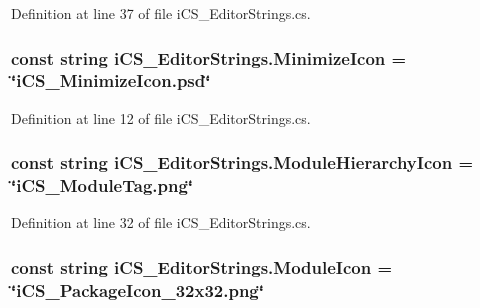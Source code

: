 Definition at line 37 of file i\+C\+S\+\_\+\+Editor\+Strings.\+cs.

\hypertarget{classi_c_s___editor_strings_ae32437183a97f9c666efb153ec6b3f74}{
\subsubsection[{Minimize\+Icon}]{\setlength{\rightskip}{0pt plus 5cm}const string i\+C\+S\+\_\+\+Editor\+Strings.\+Minimize\+Icon = \char`\"{}i\+C\+S\+\_\+\+Minimize\+Icon.\+psd\char`\"{}}}\label{classi_c_s___editor_strings_ae32437183a97f9c666efb153ec6b3f74}


Definition at line 12 of file i\+C\+S\+\_\+\+Editor\+Strings.\+cs.

\hypertarget{classi_c_s___editor_strings_a8399fc9fdabedbbe9d2347862ece3fc0}{
\subsubsection[{Module\+Hierarchy\+Icon}]{\setlength{\rightskip}{0pt plus 5cm}const string i\+C\+S\+\_\+\+Editor\+Strings.\+Module\+Hierarchy\+Icon = \char`\"{}i\+C\+S\+\_\+\+Module\+Tag.\+png\char`\"{}}}\label{classi_c_s___editor_strings_a8399fc9fdabedbbe9d2347862ece3fc0}


Definition at line 32 of file i\+C\+S\+\_\+\+Editor\+Strings.\+cs.

\hypertarget{classi_c_s___editor_strings_af8a6ecbb9ee8b07e0fe82677b8ca5c64}{
\subsubsection[{Module\+Icon}]{\setlength{\rightskip}{0pt plus 5cm}const string i\+C\+S\+\_\+\+Editor\+Strings.\+Module\+Icon = \char`\"{}i\+C\+S\+\_\+\+Package\+Icon\+\_\+32x32.\+png\char`\"{}}}\label{classi_c_s___editor_strings_af8a6ecbb9ee8b07e0fe82677b8ca5c64}


